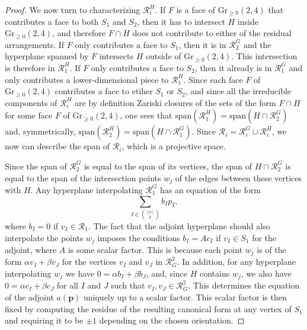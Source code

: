 \documentclass[10pt,a4paper]{amsart}
\begin{document}
\begin{proof}
We now turn to characterizing $\mathcal{R}^H_i$. If $F$ is a face of $\mathrm{Gr}_{\geq 0}(2,4)$ that contributes a face to both $S_1$ and $S_2$, then it has to intersect $H$ inside $\mathrm{Gr}_{\geq 0}(2,4)$, and therefore $F\cap H$ does not contribute to either of the residual arrangements. If $F$ only contributes a face to $S_1$, then it is in $\mathcal{R}^G_2$ and the hyperplane spanned by $F$ intersects $H$ outside of $\mathrm{Gr}_{\geq 0}(2,4)$. This intersection is therefore in $\mathcal{R}^H_1$. If $F$ only contributes a face to $S_2$, then it already is in $\mathcal{R}^G_1$ and only contributes a lower-dimensional piece to $\mathcal{R}^H_1$. Since each face $F$ of $\mathrm{Gr}_{\geq 0}(2,4)$ contributes a face to etiher $S_1$ or $S_2$, and since all the irreducible components of $\mathcal{R}_i^H$ are by definition Zariski closures of the sets of the form $F \cap H$ for some face $F$ of $\mathrm{Gr}_{\geq 0}(2,4)$, one sees that $\mathrm{span}(\mathcal{R}^H_1) = \mathrm{span}(H\cap \mathcal{R}^G_2)$ and, symmetrically, $\mathrm{span}(\mathcal{R}^H_2) = \mathrm{span}(H\cap \mathcal{R}^G_1)$. Since $\mathcal{R}_i = \mathcal{R}_i^G \cup \mathcal{R}_i^H$, we now can describe the span of $\mathcal{R}_i$, which is a projective space.

Since the span of $\mathcal{R}_2^G$ is equal to the span of its vertices, the span of $H \cap \mathcal{R}_2^G$ is equal to the span of the intersection points $w_j$ of the edges between these vertices with $H$.
Any hyperplane interpolating $\mathcal{R}_1^G$ has an equation of the form 
$$\sum\limits_{I \in \binom{[n]}{k}} b_I p_I,$$
where $b_I =0$ if $v_I \in \mathcal{R}_1$. The fact that the adjoint hyperplane should also interpolate the points $w_j$ imposes the conditions $b_I = Ac_I$ if $v_I\in S_1$ for the adjoint, where $A$ is some scalar factor. This is because each point $w_j$ is of the form $\alpha v_I + \beta v_J$ for the vertices $v_I$ and $v_J$ in $\mathcal{R}_G^2$. In addition, for any hyperplane interpolating $w_j$ we have $0=\alpha b_I+ \beta b_J$, and, since $H$ contains $w_j$, we also have $0=\alpha c_I+ \beta c_J$ for all $I$ and $J$ such that $v_I, v_J \in \mathcal{R}_G^2$. This determines the equation of the adjoint $a(\mathbf{p})$ uniquely up to a scalar factor. This scalar factor is then fixed by computing the residue of the resulting canonical form at any vertex of $S_1$ and requiring it to be $\pm 1$ depending on the chosen orientation.


\end{proof}
\end{document}
